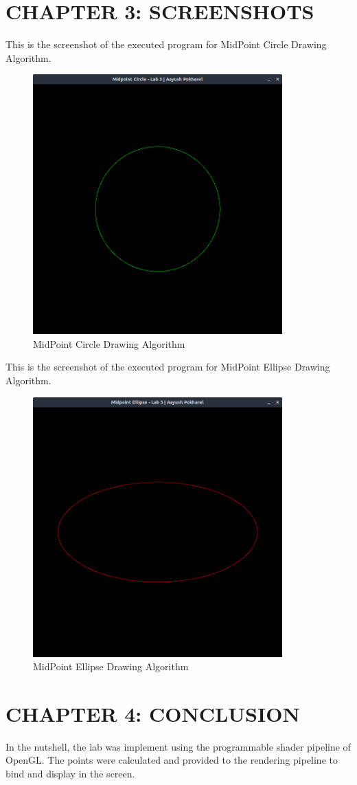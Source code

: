 \documentclass[12pt]{article}
\begin{document}
\section{CHAPTER 3: SCREENSHOTS}
This is the screenshot of the executed program for MidPoint Circle Drawing Algorithm.
\begin{figure}[h]
    \centerline{\includegraphics[height=100mm]{MidPointCircle.png}}
    \caption{MidPoint Circle Drawing Algorithm}
    \label{fig}
\end{figure}
\clearpage
This is the screenshot of the executed program for MidPoint Ellipse Drawing Algorithm.
\begin{figure}[h]
    \centerline{\includegraphics[height=100mm]{MidPointEllipse.png}}
    \caption{MidPoint Ellipse Drawing Algorithm}
    \label{fig}
\end{figure}

\section{CHAPTER 4: CONCLUSION}
In the nutshell, the lab was implement using the programmable shader pipeline of OpenGL. The points were calculated and provided to the rendering pipeline to
bind and display in the screen.
\clearpage
\thispagestyle{empty}
\printbibliography
\end{document}
